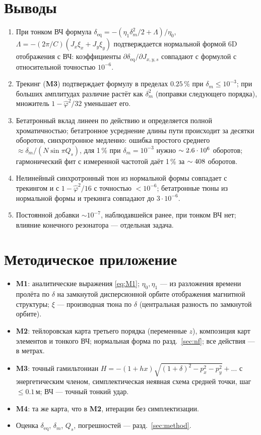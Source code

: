 \documentclass[a4paper,11pt]{article}
\newcommand{\deq}{\delta_{\mathrm{eq}}}
\newcommand{\Mone}{\textbf{M1}}\newcommand{\Mtwo}{\textbf{M2}}
\newcommand{\Mthree}{\textbf{M3}}\newcommand{\Mfour}{\textbf{M4}}
\begin{document}
\section{Выводы}
\begin{enumerate}
\item При тонком ВЧ формула $\deq=-(\eta_1\delta_m^2/2+\Lambda)/\eta_0$, $\Lambda=-(2\pi/C)(J_x\xi_x+J_y\xi_y)$ подтверждается нормальной формой 6D отображения с ВЧ: коэффициенты $\partial\deq/\partial J_{x,y,s}$ совпадают с формулой с относительной точностью $10^{-6}$.
\item Трекинг (\Mthree) подтверждает формулу в пределах $0.25\,\%$ при $\delta_m\le10^{-3}$; при больших амплитудах различие растёт как $\delta_m^2$ (поправки следующего порядка), множитель $1-\hat\varphi^2/32$ уменьшает его.
\item Бетатронный вклад линеен по действию и определяется полной хроматичностью; бетатронное усреднение длины пути происходит за десятки оборотов, синхротронное медленно: ошибка простого среднего $\approx\delta_m/(N\sin\pi Q_s)$, для 1\,\% при $\delta_m=10^{-3}$ нужно $\sim2.6\cdot10^{6}$ оборотов; гармонический фит с измеренной частотой даёт 1\,\% за $\sim408$ оборотов.
\item Нелинейный синхротронный тюн из нормальной формы совпадает с трекингом и с $1-\hat\varphi^2/16$ с точностью $<10^{-6}$; бетатронные тюны из нормальной формы и трекинга совпадают до $3\cdot10^{-6}$.
\item Постоянной добавки $\sim10^{-7}$, наблюдавшейся ранее, при тонком ВЧ нет; влияние конечного резонатора --- отдельная задача.
\end{enumerate}

\appendix
\section{Методическое приложение}
\begin{itemize}
\item \Mone: аналитические выражения \eqref{eq:M1}; $\eta_0,\eta_1$ --- из разложения времени пролёта по $\delta$ на замкнутой дисперсионной орбите отображения магнитной структуры; $\xi$ --- производная тюна по $\delta$ (центральная разность по замкнутой орбите).
\item \Mtwo: тейлоровская карта третьего порядка (переменные $z$), композиция карт элементов и тонкого ВЧ; нормальная форма по разд.~\ref{sec:nf}; все действия --- в метрах.
\item \Mthree: точный гамильтониан $H=-(1+hx)\sqrt{(1+\delta)^2-p_x^2-p_y^2}+\dots$ с энергетическим членом, симплектическая неявная схема средней точки, шаг $\le0.1$\,м; ВЧ --- точный тонкий удар.
\item \Mfour: та же карта, что в \Mtwo, итерации без симплектизации.
\item Оценка $\deq$, $\delta_m$, $Q_s$, погрешностей --- разд.~\ref{sec:method}.
\end{itemize}
\end{document}
